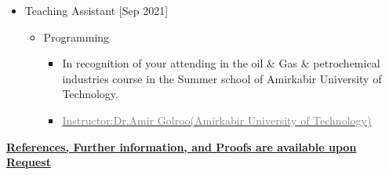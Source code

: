 \documentclass[10pt,a4paper,sans]{moderncv} %
\begin{document}
	\begin{itemize}
	     \item Teaching Assistant       \hfill[Sep 2021]
	     \begin{itemize}

			\item {}  Programming 
			\begin{itemize} 
				\item In recognition of your attending in the oil \& Gas \& petrochemical industries course in the Summer school of Amirkabir University of Technology.
				\item\href{https://aut.ac.ir/cv/2035/amir-golroo?slc_lang=en&&cv=2035&mod=scv}{\textcolor{gray}{Instructor:Dr.Amir Golroo(Amirkabir University of Technology)}}
			\end{itemize}
	 		
				\newline
			
		\end{itemize}
	\end{itemize}
	
	\vspace{1.3 em}
	
	
	
	\centerline{\underline{\textbf{	\faExclamationCircle \hspace{0.5 pt} References, Further information, and Proofs are available upon Request }}}
	
\end{document}
